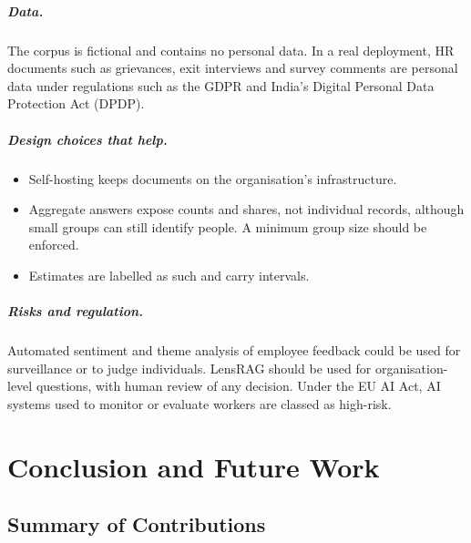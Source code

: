 \documentclass[11pt,letterpaper,oneside]{report}
\begin{document}
\paragraph{Data.}
The corpus is fictional and contains no personal data. In a real deployment,
HR documents such as grievances, exit interviews and survey comments are
personal data under regulations such as the GDPR and India's Digital
Personal Data Protection Act (DPDP).

\paragraph{Design choices that help.}
\begin{itemize}
  \item Self-hosting keeps documents on the organisation's infrastructure.
  \item Aggregate answers expose counts and shares, not individual records,
  although small groups can still identify people. A minimum group size
  should be enforced.
  \item Estimates are labelled as such and carry intervals.
\end{itemize}

\paragraph{Risks and regulation.}
Automated sentiment and theme analysis of employee feedback could be used for
surveillance or to judge individuals. LensRAG should be used for
organisation-level questions, with human review of any decision. Under the
EU AI Act, AI systems used to monitor or evaluate workers are classed as
high-risk.

\chapter{Conclusion and Future Work}
\label{ch:conclusion}

\section{Summary of Contributions}
\label{sec:summary}
\end{document}
